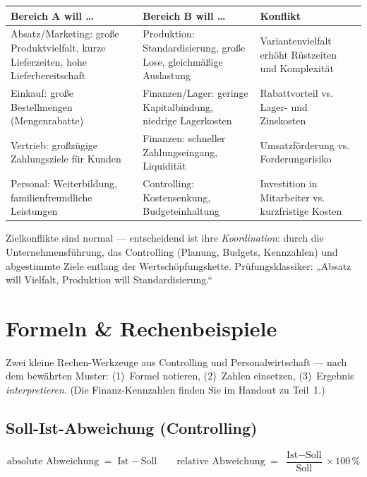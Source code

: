 \documentclass[11pt, a4paper]{article}
\begin{document}
\begin{center}
\begin{tabular}{p{4.4cm} p{4.4cm} p{5.0cm}}
\textbf{Bereich A will …} & \textbf{Bereich B will …} & \textbf{Konflikt}\\
\hline
Absatz/Marketing: große Produktvielfalt, kurze Lieferzeiten, hohe Lieferbereitschaft &
Produktion: Standardisierung, große Lose, gleichmäßige Auslastung & Variantenvielfalt
erhöht Rüstzeiten und Komplexität\\
Einkauf: große Bestellmengen (Mengenrabatte) & Finanzen/Lager: geringe Kapitalbindung,
niedrige Lagerkosten & Rabattvorteil vs. Lager- und Zinskosten\\
Vertrieb: großzügige Zahlungsziele für Kunden & Finanzen: schneller Zahlungseingang,
Liquidität & Umsatzförderung vs. Forderungsrisiko\\
Personal: Weiterbildung, familienfreundliche Leistungen & Controlling: Kostensenkung,
Budgeteinhaltung & Investition in Mitarbeiter vs. kurzfristige Kosten\\
\end{tabular}
\end{center}

\begin{merksatz}
Zielkonflikte sind normal --- entscheidend ist ihre \emph{Koordination}: durch die
Unternehmensführung, das Controlling (Planung, Budgets, Kennzahlen) und abgestimmte
Ziele entlang der Wertschöpfungskette. Prüfungsklassiker: „Absatz will Vielfalt,
Produktion will Standardisierung.``
\end{merksatz}

\section{Formeln \& Rechenbeispiele}

Zwei kleine Rechen-Werkzeuge aus Controlling und Personalwirtschaft --- nach dem
bewährten Muster: (1)~Formel notieren, (2)~Zahlen einsetzen, (3)~Ergebnis
\emph{interpretieren}. (Die Finanz-Kennzahlen finden Sie im Handout zu Teil~1.)

\subsection{Soll-Ist-Abweichung (Controlling)}

\begin{merksatz}[title={\bfseries Formeln: absolute und relative Abweichung}]
\[
\text{absolute Abweichung} \;=\; \text{Ist} - \text{Soll}
\qquad
\text{relative Abweichung} \;=\; \frac{\text{Ist} - \text{Soll}}{\text{Soll}} \times 100\,\%
\]
\end{merksatz}
\end{document}
